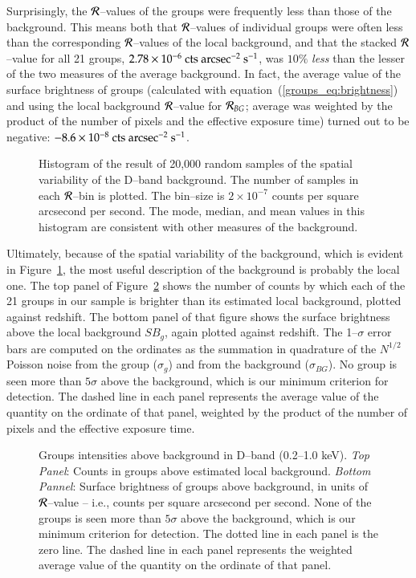 Surprisingly, the $\mathcal{R}$--values of the groups were frequently less than
those of the background.  This means both that $\mathcal{R}$--values of
individual groups were often less than the corresponding $\mathcal{R}$--values
of the local background, and that the stacked $\mathcal{R}$--value for all 21
groups, $2.78\times 10^{-6}{\rm~cts~arcsec^{-2}~s^{-1}}$, was $10\%$
{\it less} than the lesser of the two measures of the average
background.  In fact, the average value of the surface brightness of
groups (calculated with equation~(\ref{groups_eq:brightness}) and
using the local background $\mathcal{R}$--value for $\mathcal{R}_{BG}$; average was
weighted by the product of the number of pixels and the effective
exposure time) turned out to be negative: $-8.6\times
10^{-8}{\rm~cts~arcsec^{-2}~s^{-1}}$.

\begin{figure}[p]
\caption[Histogram of samples of D--band background brightness.]{
Histogram of the result of 20,000 random samples of the spatial
variability of the D--band background.  The number of samples in each
$\mathcal{R}$--bin is plotted.  The bin--size is $2\times 10^{-7}$ counts per
square arcsecond per second.  The mode, median, and mean values in
this histogram are consistent with other measures of the background.
}
\label{groups_fig:histfig}
\end{figure}
\afterpage{\clearpage}

Ultimately, because of the spatial variability of the background,
which is evident in Figure~\ref{groups_fig:histfig}, the most useful
description of the background is probably the local one.  The top
panel of Figure~\ref{groups_fig:diffplot} shows the number of counts
by which each of the 21 groups in our sample is brighter than its
estimated local background, plotted against redshift.  The bottom
panel of that figure shows the surface brightness above the local
background $SB_g$, again plotted against redshift.  The 1--$\sigma$
error bars are computed on the ordinates as the summation in
quadrature of the $N^{1/2}$ Poisson noise from the group ($\sigma_g$)
and from the background ($\sigma_{BG}$).  No group is seen more than
$5\sigma$ above the background, which is our minimum criterion for
detection.  The dashed line in each panel represents the average value
of the quantity on the ordinate of that panel, weighted by the product
of the number of pixels and the effective exposure time.

\begin{figure}[p]
\caption[Groups intensities above background in D--band (0.2--1.0
keV).]{ Groups intensities above background in D--band (0.2--1.0 keV).
{\it Top Panel}: Counts in groups above estimated local background.
{\it Bottom Pannel}: Surface brightness of groups above background, in
units of $\mathcal{R}$--value -- i.e., counts per square arcsecond per second.
None of the groups is seen more than $5\sigma$ above the background,
which is our minimum criterion for detection.  The dotted line in each
panel is the zero line.  The dashed line in each panel represents the
weighted average value of the quantity on the ordinate of that panel.}
\label{groups_fig:diffplot}
\end{figure}
\afterpage{\clearpage}

